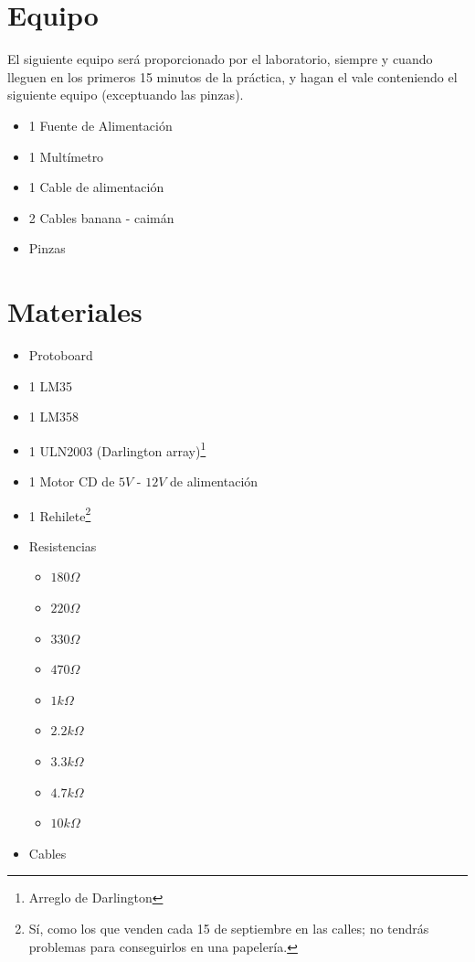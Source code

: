 \section{Equipo}

	El siguiente equipo será proporcionado por el laboratorio, siempre y cuando lleguen en los primeros 15 minutos de la práctica, y hagan el vale conteniendo el siguiente equipo (exceptuando las pinzas).

	\begin{itemize}
		\item 1 Fuente de Alimentación
		\item 1 Multímetro
		\item 1 Cable de alimentación
		\item 2 Cables banana - caimán
		\item Pinzas
	\end{itemize}


\section{Materiales}

	\begin{itemize}
		\item Protoboard
		\item 1 LM35
		\item 1 LM358
		\item 1 ULN2003 (Darlington array)\footnote{Arreglo de Darlington}
		\item 1 Motor CD de $5 V$ - $12 V$ de alimentación
		\item 1 Rehilete\footnote{Sí, como los que venden cada 15 de septiembre en las calles; no tendrás problemas para conseguirlos en una papelería.}
		\item Resistencias
		\begin{itemize}
			\item $180 \Omega$
			\item $220 \Omega$
			\item $330 \Omega$
			\item $470 \Omega$
			\item $1 k\Omega$
			\item $2.2 k\Omega$
			\item $3.3 k\Omega$
			\item $4.7 k\Omega$
			\item $10 k\Omega$
		\end{itemize}
		\item Cables
	\end{itemize}

